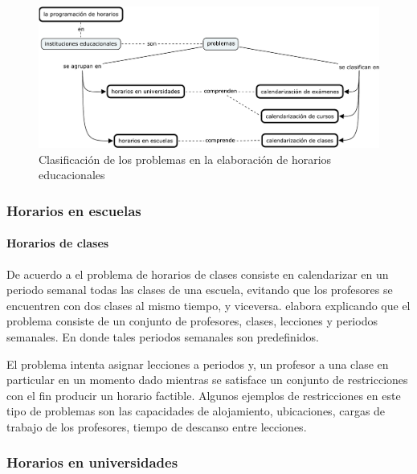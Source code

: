\documentclass[spanish,draft,12pt,headsepline,footsepline,paper=letter]{scrreprt}
\begin{document}
\begin{figure}[hbtp]
\centering
\includegraphics[width=\textwidth]{timetabling_classification.pdf}
\caption[Clasificación del problema]{Clasificación de los problemas en la elaboración de horarios educacionales}
\label{fig:timetabling_classification}
\end{figure}

\subsubsection{Horarios en escuelas}


\paragraph{Horarios de clases}

De acuerdo a \citet[p.~88]{schaerf99a-survey-of-automated} el problema de horarios de clases consiste en calendarizar en un periodo semanal todas las clases de una escuela, evitando que los profesores se encuentren con dos clases al mismo tiempo, y viceversa. \citet[p.~10,11]{abdullah06heuristic-approaches} elabora explicando que el problema consiste de un conjunto de profesores, clases, lecciones y periodos semanales. En donde tales periodos semanales son predefinidos.

El problema intenta asignar lecciones a periodos y, un profesor a una clase en particular en un momento dado mientras se satisface un conjunto de restricciones con el fin producir un horario factible. Algunos ejemplos de restricciones en este tipo de problemas son las capacidades de alojamiento, ubicaciones, cargas de trabajo de los profesores, tiempo de descanso entre lecciones.

\subsubsection{Horarios en universidades}
\end{document}
